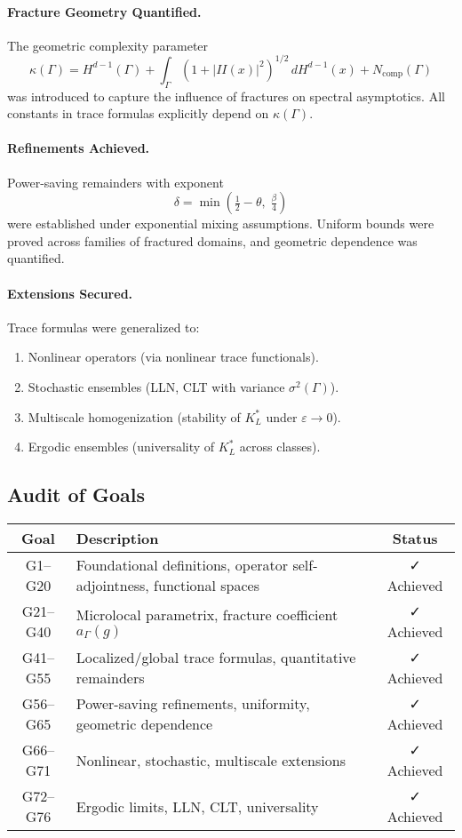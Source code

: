 \paragraph{Fracture Geometry Quantified.}
The geometric complexity parameter
\[
    \kappa(\Gamma) = H^{d-1}(\Gamma) + \int_\Gamma (1+|II(x)|^2)^{1/2}\,dH^{d-1}(x) + N_{\mathrm{comp}}(\Gamma)
\]
was introduced to capture the influence of fractures on spectral asymptotics.
All constants in trace formulas explicitly depend on $\kappa(\Gamma)$.

\paragraph{Refinements Achieved.}
Power-saving remainders with exponent
\[
    \delta = \min\!\left(\tfrac{1}{2}-\theta,\;\tfrac{\beta}{4}\right)
\]
were established under exponential mixing assumptions. Uniform bounds were
proved across families of fractured domains, and geometric dependence was
quantified.

\paragraph{Extensions Secured.}
Trace formulas were generalized to:
\begin{enumerate}
    \item Nonlinear operators (via nonlinear trace functionals).
    \item Stochastic ensembles (LLN, CLT with variance $\sigma^2(\Gamma)$).
    \item Multiscale homogenization (stability of $K_L^*$ under $\varepsilon\to0$).
    \item Ergodic ensembles (universality of $K_L^*$ across classes).
\end{enumerate}

\subsection*{Audit of Goals}

\begin{longtable}{|c|p{10cm}|c|}
\hline
\textbf{Goal} & \textbf{Description} & \textbf{Status} \\
\hline
G1–G20 & Foundational definitions, operator self-adjointness, functional spaces & ✓ Achieved \\
G21–G40 & Microlocal parametrix, fracture coefficient $a_\Gamma(g)$ & ✓ Achieved \\
G41–G55 & Localized/global trace formulas, quantitative remainders & ✓ Achieved \\
G56–G65 & Power-saving refinements, uniformity, geometric dependence & ✓ Achieved \\
G66–G71 & Nonlinear, stochastic, multiscale extensions & ✓ Achieved \\
G72–G76 & Ergodic limits, LLN, CLT, universality & ✓ Achieved \\
\hline
\end{longtable}

